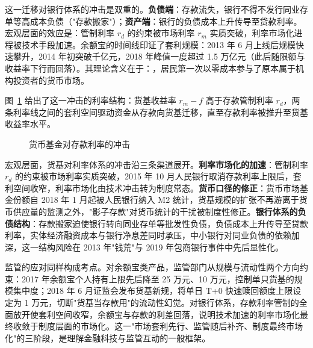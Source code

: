 这一迁移对银行体系的冲击是双重的。\textbf{负债端}：存款流失，银行不得不发行同业存单等高成本负债（"存款搬家"）；\textbf{资产端}：银行的负债成本上升传导至贷款利率。宏观层面的效应是：管制利率 $r_d$ 的约束被市场利率 $r_m$ 实质突破，利率市场化进程被技术手段加速。余额宝的时间线印证了套利规模：2013 年 6 月上线后规模快速攀升，2014 年初突破千亿元，2018 年峰值一度超过 1.5 万亿元（此后随限额与收益率下行而回落）。其理论含义在于：，居民第一次以零成本参与了原本属于机构投资者的货币市场。

图~\ref{fig:rate} 给出了这一冲击的利率结构：货基收益率 $r_m - f$ 高于存款管制利率 $r_d$，两条利率线之间的套利空间驱动资金从存款向货基迁移，直至存款利率被推升至货基收益率水平。

\begin{figure}[htbp]
\centering
{}
\caption{货币基金对存款利率的冲击}
\label{fig:rate}
\end{figure}

宏观层面，货基对利率体系的冲击沿三条渠道展开。\textbf{利率市场化的加速}：管制利率 $r_d$ 的约束被市场利率实质突破，2015 年 10 月人民银行取消存款利率上限后，套利空间收窄，利率市场化由技术冲击转为制度常态。\textbf{货币口径的修正}：货币市场基金份额自 2018 年 1 月起被人民银行纳入 M2 统计，货基规模的扩张不再游离于货币供应量的监测之外，"影子存款"对货币统计的干扰被制度性修正。\textbf{银行体系的负债结构}：存款搬家迫使银行转向同业存单等批发性负债，负债成本上升传导至贷款利率，实体经济融资成本与银行净息差同时承压，中小银行对同业负债的依赖加深，这一结构风险在 2013 年"钱荒"与 2019 年包商银行事件中先后显性化。

监管的应对同样构成考点。对余额宝类产品，监管部门从规模与流动性两个方向约束：2017 年余额宝个人持有上限先后降至 25 万元、10 万元，控制单只货基的规模集中度；2018 年 6 月证监会发布货基新规，将单日 T+0 快速赎回额度上限设定为 1 万元，切断"货基当存款用"的流动性幻觉。对银行体系，存款利率管制的全面放开使套利空间收窄，余额宝与存款的利差回落，说明技术加速的利率市场化最终收敛于制度层面的市场化。这一"市场套利先行、监管随后补齐、制度最终市场化"的三阶段，是理解金融科技与监管互动的一般框架。

